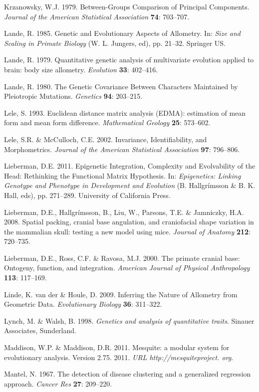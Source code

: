 \documentclass[12pt,twoside]{report}
\begin{document}
Krzanowsky, W.J. 1979. Between-Groups Comparison of Principal
Components. \emph{Journal of the American Statistical Association}
\textbf{74}: 703--707.

Lande, R. 1985. Genetic and Evolutionary Aspects of Allometry. In:
\emph{Size and Scaling in Primate Biology} (W. L. Jungers, ed), pp.
21--32. Springer US.

Lande, R. 1979. Quantitative genetic analysis of multivariate evolution
applied to brain: body size allometry. \emph{Evolution} \textbf{33}:
402--416.

Lande, R. 1980. The Genetic Covariance Between Characters Maintained by
Pleiotropic Mutations. \emph{Genetics} \textbf{94}: 203--215.

Lele, S. 1993. Euclidean distance matrix analysis (EDMA): estimation of
mean form and mean form difference. \emph{Mathematical Geology}
\textbf{25}: 573--602.

Lele, S.R. \& McCulloch, C.E. 2002. Invariance, Identifiability, and
Morphometrics. \emph{Journal of the American Statistical Association}
\textbf{97}: 796--806.

Lieberman, D.E. 2011. Epigenetic Integration, Complexity and
Evolvability of the Head: Rethinking the Functional Matrix Hypothesis.
In: \emph{Epigenetics: Linking Genotype and Phenotype in Development and
Evolution} (B. Hallgrímsson \& B. K. Hall, eds), pp. 271--289.
University of California Press.

Lieberman, D.E., Hallgrímsson, B., Liu, W., Parsons, T.E. \& Jamniczky,
H.A. 2008. Spatial packing, cranial base angulation, and craniofacial
shape variation in the mammalian skull: testing a new model using mice.
\emph{Journal of Anatomy} \textbf{212}: 720--735.

Lieberman, D.E., Ross, C.F. \& Ravosa, M.J. 2000. The primate cranial
base: Ontogeny, function, and integration. \emph{American Journal of
Physical Anthropology} \textbf{113}: 117--169.

Linde, K. van der \& Houle, D. 2009. Inferring the Nature of Allometry
from Geometric Data. \emph{Evolutionary Biology} \textbf{36}: 311--322.

Lynch, M. \& Walsh, B. 1998. \emph{Genetics and analysis of quantitative
traits}. Sinauer Associates, Sunderland.

Maddison, W.P. \& Maddison, D.R. 2011. Mesquite: a modular system for
evolutionary analysis. Version 2.75. 2011. \emph{URL
http://mesquiteproject. org}.

Mantel, N. 1967. The detection of disease clustering and a generalized
regression approach. \emph{Cancer Res} \textbf{27}: 209--220.
\end{document}
